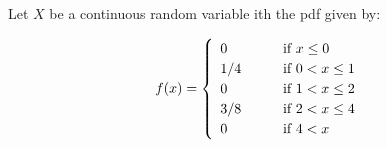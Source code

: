 


\renewcommand\assignment{Worksheet 13, Due February 17, 4:15pm}


    \iffalse
    \begin{equation*}
        \begin{gathered}
            Equations go here.
        \end{gathered}
    \end{equation*}

    \resizebox{\hsize}{!}{$Long equation goes here$}

    \begin{multicol*}{# of columns}
    \end{multicol*}

    \horizontal

    \fi


    Let $X$ be a continuous random variable ith the pdf given by:

    \begin{equation*}
        f(x) = 
        \left\{
            {\def\arraystretch{1.2}
            \begin{array}{lll}
            0   & \quad & \text{if } x \leq 0       \\
            1/4 & \quad & \text{if } 0 < x \leq 1   \\
            0   & \quad & \text{if } 1 < x \leq 2   \\
            3/8 & \quad & \text{if } 2 < x \leq 4   \\
            0   & \quad & \text{if } 4 < x  
        \end{array}}
        \right.
    \end{equation*}

